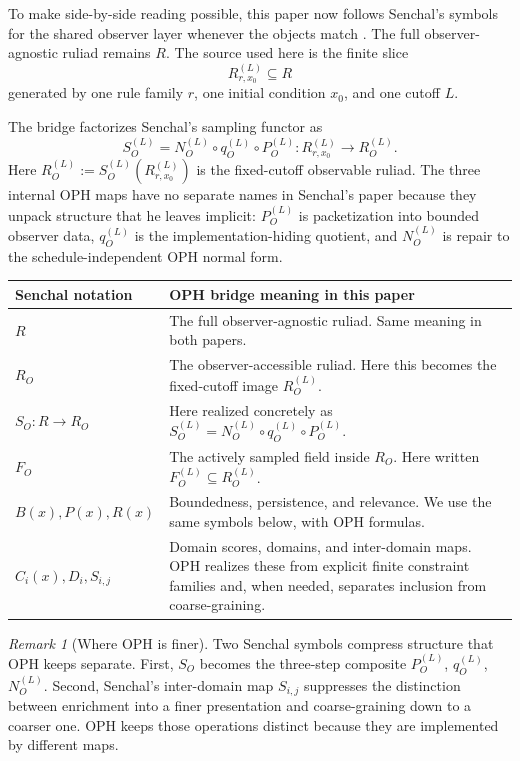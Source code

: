 \documentclass[11pt]{article}
\theoremstyle{remark}
\newtheorem{remark}[theorem]{Remark}
\theoremstyle{plain}
\begin{document}
To make side-by-side reading possible, this paper now follows Senchal's symbols for the shared observer layer whenever the objects match \cite{senchal2025}. The full observer-agnostic ruliad remains \(R\). The source used here is the finite slice
\[
R^{(L)}_{r,x_0}\subseteq R
\]
generated by one rule family \(r\), one initial condition \(x_0\), and one cutoff \(L\).

The bridge factorizes Senchal's sampling functor as
\[
S_O^{(L)}=N_O^{(L)}\circ q_O^{(L)}\circ P_O^{(L)}:
R^{(L)}_{r,x_0}\to R_O^{(L)}.
\]
Here \(R_O^{(L)}:=S_O^{(L)}(R^{(L)}_{r,x_0})\) is the fixed-cutoff observable ruliad. The three internal OPH maps have no separate names in Senchal's paper because they unpack structure that he leaves implicit: \(P_O^{(L)}\) is packetization into bounded observer data, \(q_O^{(L)}\) is the implementation-hiding quotient, and \(N_O^{(L)}\) is repair to the schedule-independent OPH normal form.

\begin{center}
\begin{tabular}{p{}p{}}
\toprule
Senchal notation & OPH bridge meaning in this paper \\
\midrule
\(R\) & The full observer-agnostic ruliad. Same meaning in both papers. \\
\(R_O\) & The observer-accessible ruliad. Here this becomes the fixed-cutoff image \(R_O^{(L)}\). \\
\(S_O:R\to R_O\) & Here realized concretely as \(S_O^{(L)}=N_O^{(L)}\circ q_O^{(L)}\circ P_O^{(L)}\). \\
\(F_O\) & The actively sampled field inside \(R_O\). Here written \(F_O^{(L)}\subseteq R_O^{(L)}\). \\
\(B(x),P(x),R(x)\) & Boundedness, persistence, and relevance. We use the same symbols below, with OPH formulas. \\
\(C_i(x),D_i,S_{i,j}\) & Domain scores, domains, and inter-domain maps. OPH realizes these from explicit finite constraint families and, when needed, separates inclusion from coarse-graining. \\
\bottomrule
\end{tabular}
\end{center}

\begin{remark}[Where OPH is finer]
Two Senchal symbols compress structure that OPH keeps separate. First, \(S_O\) becomes the three-step composite \(P_O^{(L)}\), \(q_O^{(L)}\), \(N_O^{(L)}\). Second, Senchal's inter-domain map \(S_{i,j}\) suppresses the distinction between enrichment into a finer presentation and coarse-graining down to a coarser one. OPH keeps those operations distinct because they are implemented by different maps.
\end{remark}
\end{document}
